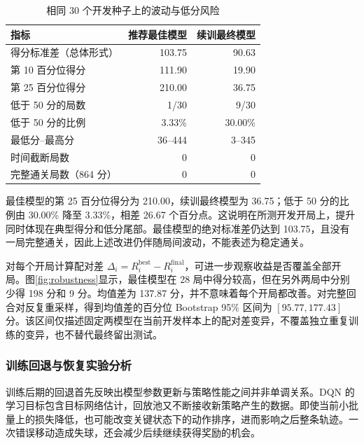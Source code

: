 \begin{table}[!htbp]
 \centering\small
 \caption{相同 30 个开发种子上的波动与低分风险}\label{tab:robustness}
 \begin{tabularx}{.92\linewidth}{Y r r}
 \toprule
 指标 & 推荐最佳模型 & 续训最终模型\\
 \midrule
 得分标准差（总体形式） & 103.75 & 90.63\\
 第 10 百分位得分 & 111.90 & 19.90\\
 第 25 百分位得分 & 210.00 & 36.75\\
 低于 50 分的局数 & 1/30 & 9/30\\
 低于 50 分的比例 & 3.33\% & 30.00\%\\
 最低分--最高分 & 36--444 & 3--345\\
 时间截断局数 & 0 & 0\\
 完整通关局数（864 分） & 0 & 0\\
 \bottomrule
 \end{tabularx}
\end{table}

最佳模型的第 25 百分位得分为 210.00，续训最终模型为 36.75；低于 50 分的比例由 30.00\% 降至 3.33\%，相差 26.67 个百分点。这说明在所测开发开局上，提升同时体现在典型得分和低分尾部。最佳模型的绝对标准差仍达到 103.75，且没有一局完整通关，因此上述改进仍伴随局间波动，不能表述为稳定通关。

对每个开局计算配对差 $\Delta_i=R_i^{\mathrm{best}}-R_i^{\mathrm{final}}$，可进一步观察收益是否覆盖全部开局。图\ref{fig:robustness}显示，最佳模型在 28 局中得分较高，但在另外两局中分别少得 198 分和 9 分。均值差为 137.87 分，并不意味着每个开局都改善。对完整回合对反复重采样，得到均值差的百分位 Bootstrap 95\% 区间为 $[95.77,177.43]$ 分。该区间仅描述固定两模型在当前开发样本上的配对差变异，不覆盖独立重复训练的变异，也不替代最终留出测试。


\subsubsection{训练回退与恢复实验分析}
训练后期的回退首先反映出模型参数更新与策略性能之间并非单调关系。DQN 的学习目标包含目标网络估计，回放池又不断接收新策略产生的数据。即使当前小批量上的损失降低，也可能改变关键状态下的动作排序，进而影响之后整条轨迹。一次错误移动造成失球，还会减少后续继续获得奖励的机会。

